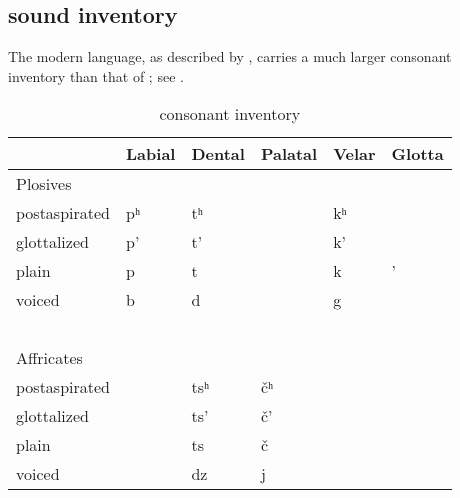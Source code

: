 \documentclass[output=paper]{LSP/langsci}
\begin{document}
\subsection{ sound inventory}

The modern  language, as described by \citet{Linn2000}, carries a much larger consonant inventory than that of ; see .

\begin{table}[p]
\caption{ consonant inventory} \label{yuchiinventory}
    \begin{tabular}{llllll}\lsptoprule
    ~                           & Labial    &  Dental      &  Palatal        &  Velar      & Glotta  \\
    \midrule
     Plosives            & ~                   & ~                    & ~                       & ~                   & ~                \\
    postaspirated               & pʰ & tʰ  & ~                       & kʰ & ~                \\
    glottalized                 & p'                  & t'                   & ~                       & k'                  & ~                \\
    plain                       & p                   & t                    & ~                       & k                   & '                \\
    voiced                      & b                   & d                    & ~                       & g                   & ~                \\
    ~                           & ~                   & ~                    & ~                       & ~                   & ~                \\
    Affricates        & ~                   & ~                    & ~                       & ~                   & ~                \\
    postaspirated               & ~                   & tsʰ & \v{c}ʰ & ~                   & ~                \\
    glottalized                 & ~                   & ts'                  & \v{c}'                  & ~                   & ~                \\
    plain                       & ~                   & ts                   & \v{c}                   & ~                   & ~                \\
    voiced                      & ~                   & dz                   & j                  & ~                   & ~                \\

\end{tabular}
\end{table}
\end{document}
